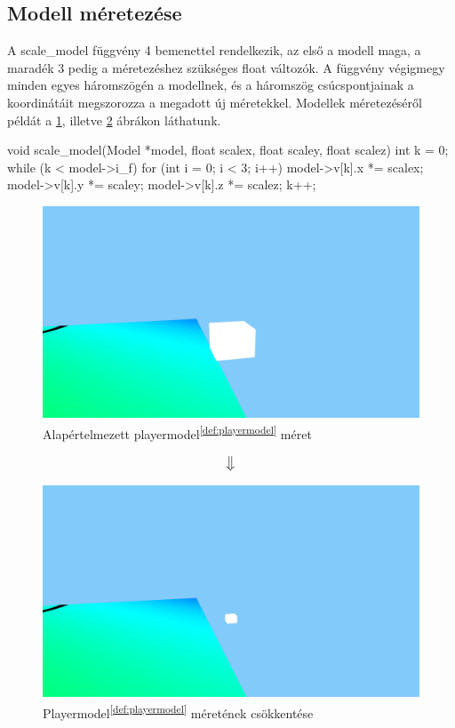 \subsection{Modell méretezése}
A scale\_model függvény 4 bemenettel rendelkezik, az első a modell maga, a maradék 3 pedig a méretezéshez szükséges float változók. A függvény végigmegy minden egyes háromszögén a modellnek, és a háromszög csúcspontjainak a koordinátáit megszorozza a megadott új méretekkel. Modellek méretezéséről példát a \ref{fig:meret_1}, illetve \ref{fig:meret_2} ábrákon láthatunk.
\begin{cpp}
void scale_model(Model *model, float scalex, float scaley, 
float scalez)
{
    int k = 0;
    while (k < model->i_f)
    {
        for (int i = 0; i < 3; i++)
        {
            model->v[k].x *= scalex;
            model->v[k].y *= scaley;
            model->v[k].z *= scalez;
        }
        k++;
    }
}
\end{cpp}


\newpage

\begin{figure}[h]
	\centering
	\includegraphics[width=13truecm, height=7truecm]{images/modell_4.3.1.1.png}
	\caption{Alapértelmezett playermodel\textsuperscript{\ref{def:playermodel}} méret}
	\label{fig:meret_1}
\end{figure}

	$$\big\Downarrow$$
	
	
\begin{figure}[h]
		\centering
		\includegraphics[width=13truecm, height=7truecm]{images/modell_4.3.1.3.png}
		\caption{Playermodel\textsuperscript{\ref{def:playermodel}} méretének csökkentése}
		\label{fig:meret_2}
\end{figure}

